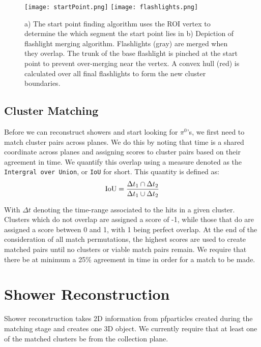 \documentclass[a4paper]{article}
\begin{document}
\begin{figure}[H]
\centering
\texttt{[image: startPoint.png]}
\hspace{3 mm}
\texttt{[image: flashlights.png]}
\caption{a) The start point finding algorithm uses the ROI vertex to determine the which segment the start point lies in   b) Depiction of flashlight merging algorithm. Flashlights (gray) are merged when they overlap. The trunk of the base flashlight is pinched at the start point to prevent over-merging near the vertex. A convex hull (red) is calculated over all final flashlights to form the new cluster boundaries. }
\label{fig:flashlights}
\end{figure}

\subsection{Cluster Matching}
Before we can reconstruct showers and start looking for $\pi^0$'s, we first need to match cluster pairs across planes. We do this by noting that time is a shared coordinate across planes and assigning scores to cluster pairs based on their agreement in time. We quantify this overlap using a measure denoted as the \texttt{Intergral over Union}, or \texttt{IoU} for short. This quantity is defined as:
\begin{equation}
  {\rm IoU} = \frac{ \Delta t_1 \cap \Delta t_2  }{ \Delta t_1 \cup \Delta t_2 }
\end{equation}

With $\Delta t$ denoting the time-range associated to the hits in a given cluster.  Clusters which do not overlap are assigned a score of -1, while those that do are assigned a score between 0 and 1, with 1 being perfect overlap. At the end of the consideration of all match permutations, the highest scores are used to create matched pairs until no clusters or viable match pairs remain. We require that there be at minimum a 25\% agreement in time in order for a match to be made. 

\section{Shower Reconstruction}
Shower reconstruction takes 2D information from pfparticles created during the matching stage and creates one 3D object.  We currently require that at least one of the matched clusters be from the collection plane.
\end{document}
